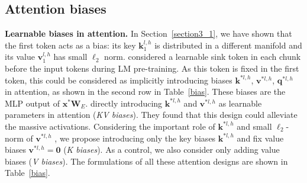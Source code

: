 \vspace{-0.2cm}
\subsection{Attention biases}
\vspace{-0.2cm}
\textbf{Learnable biases in attention.} In Section~\ref{section3_1}, we have shown that the first token acts as a bias: its key $\boldsymbol{k}_1^{l\textrm{,}\,h}$ is distributed in a different manifold and its value $\boldsymbol{v}_1^{l\textrm{,}\,h}$ has small $\ell_2$ norm. \citet{xiao2023efficient} considered a learnable sink token in each chunk before the input tokens during LM pre-training. As this token is fixed in the first token, this could be considered as implicitly introducing biases $\boldsymbol{k}^{*l,h}$, $\boldsymbol{v}^{*l,h}$, $\boldsymbol{q}^{*l,h}$ in attention, as shown in the second row in Table~\ref{bias}. These biases are the MLP output of $\boldsymbol{x}^*\boldsymbol{W}_E$. \citet{sun2024massive} directly introducing $\boldsymbol{k}^{*l,h}$ and $\boldsymbol{v}^{*l,h}$ as learnable parameters in attention (\emph{KV biases}). They found that this design could alleviate the massive activations. Considering the important role of $\boldsymbol{k}^{*l,h}$ and small $\ell_2$-norm of $\boldsymbol{v}^{*l,h}$ , we propose introducing only the key biases  $\boldsymbol{k}^{*l,h}$ and fix value biases $\boldsymbol{v}^{*l,h}=\boldsymbol{0}$ (\emph{K biases}). As a control, we also consider only adding value biases (\emph{V biases}). The formulations of all these attention designs are shown in Table~\ref{bias}.






